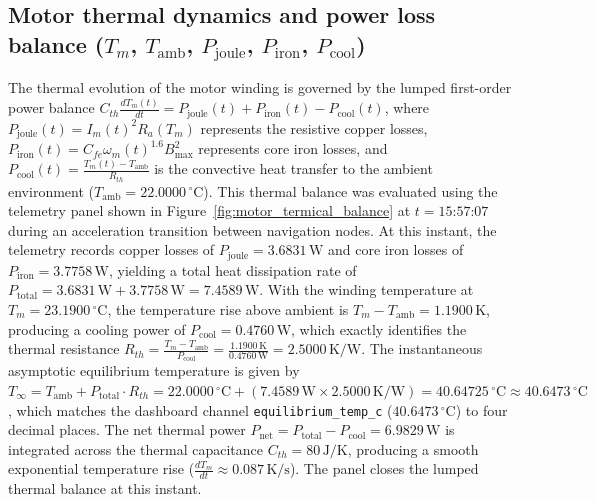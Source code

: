 \subsection{Motor thermal dynamics and power loss balance (\texorpdfstring{$T_m$, $T_{\mathrm{amb}}$, $P_{\mathrm{joule}}$, $P_{\mathrm{iron}}$, $P_{\mathrm{cool}}$}{Tm, Tamb, Pjoule, Piron, Pcool})}
The thermal evolution of the motor winding is governed by the lumped first-order power balance $C_{th} \frac{dT_m(t)}{dt} = P_{\text{joule}}(t) + P_{\text{iron}}(t) - P_{\text{cool}}(t)$, where $P_{\text{joule}}(t) = I_m(t)^2 R_a(T_m)$ represents the resistive copper losses, $P_{\text{iron}}(t) = C_{fe} \omega_m(t)^{1.6} B_{\max}^2$ represents core iron losses, and $P_{\text{cool}}(t) = \frac{T_m(t) - T_{\text{amb}}}{R_{th}}$ is the convective heat transfer to the ambient environment ($T_{\text{amb}} = 22.0000\,^{\circ}\text{C}$). This thermal balance was evaluated using the telemetry panel shown in Figure~\ref{fig:motor_termical_balance} at $t = \text{15:57:07}$ during an acceleration transition between navigation nodes. At this instant, the telemetry records copper losses of $P_{\text{joule}} = 3.6831\,\text{W}$ and core iron losses of $P_{\text{iron}} = 3.7758\,\text{W}$, yielding a total heat dissipation rate of $P_{\text{total}} = 3.6831\,\text{W} + 3.7758\,\text{W} = 7.4589\,\text{W}$. With the winding temperature at $T_m = 23.1900\,^{\circ}\text{C}$, the temperature rise above ambient is $T_m - T_{\text{amb}} = 1.1900\,\text{K}$, producing a cooling power of $P_{\text{cool}} = 0.4760\,\text{W}$, which exactly identifies the thermal resistance $R_{th} = \frac{T_m - T_{\text{amb}}}{P_{\text{cool}}} = \frac{1.1900\,\text{K}}{0.4760\,\text{W}} = 2.5000\,\text{K/W}$. The instantaneous asymptotic equilibrium temperature is given by $T_{\infty} = T_{\text{amb}} + P_{\text{total}} \cdot R_{th} = 22.0000\,^{\circ}\text{C} + (7.4589\,\text{W} \times 2.5000\,\text{K/W}) = 40.64725\,^{\circ}\text{C} \approx 40.6473\,^{\circ}\text{C}$, which matches the dashboard channel \texttt{equilibrium\_temp\_c} ($40.6473\,^{\circ}\text{C}$) to four decimal places. The net thermal power $P_{\text{net}} = P_{\text{total}} - P_{\text{cool}} = 6.9829\,\text{W}$ is integrated across the thermal capacitance $C_{th} = 80\,\text{J/K}$, producing a smooth exponential temperature rise ($\frac{dT_m}{dt} \approx 0.087\,\text{K/s}$). The panel closes the lumped thermal balance at this instant.

